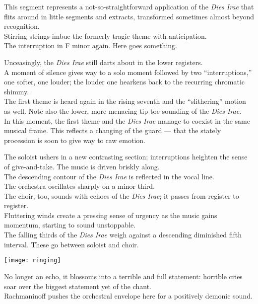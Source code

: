 \documentclass{beamer}
\begin{document}
\begin{frame} 
  This segment represents a not-so-straightforward application of the \textit{Dies Irae} that flits around in little segments and extracts, transformed sometimes almost beyond recognition. 
  \pause \\ 
  Stirring strings imbue the formerly tragic theme with anticipation. 
  \pause \\ 
  The interruption in F minor again. Here goes something. 
\end{frame}
  
\begin{frame} 
  Unceasingly, the \textit{Dies Irae} still darts about in the lower registers. 
  \pause \\ 
  A moment of silence gives way to a solo moment followed by two ``interruptions,'' one softer, one louder; the louder one hearkens back to the recurring chromatic shimmy. 
  \pause \\ 
  The first theme is heard again in the rising seventh and the ``slithering'' motion as well. Note also the lower, more menacing tip-toe sounding of the \textit{Dies Irae}. 
  \pause \\ 
  In this moment, the first theme and the \textit{Dies Irae} manage to coexist in the same musical frame. This reflects a changing of the guard --- that the stately procession is soon to give way to raw emotion. 
\end{frame} 

\begin{frame}
  The soloist ushers in a new contrasting section; interruptions heighten the sense of give-and-take. The music is driven briskly along. 
  \pause \\ 
  The descending contour of the \textit{Dies Irae} is reflected in the vocal line. 
  \pause \\
  The orchestra oscillates sharply on a minor third. 
  \pause \\ 
  The choir, too, sounds with echoes of the \textit{Dies Irae}; it passes from register to register. 
  \pause \\
  Fluttering winds create a pressing sense of urgency as the music gains momentum, starting to sound unstoppable. 
  \pause \\ 
  The falling thirds of the \textit{Dies Irae} weigh against a descending diminished fifth interval. These go between soloist and choir. 
\end{frame} 

\begin{frame}
  \begin{center} 
    \texttt{[image: ringing]} 
  \end{center} 
  No longer an echo, it blossoms into a terrible and full statement: horrible cries soar over the biggest statement yet of the chant. 
  \pause \\ 
  Rachmaninoff pushes the orchestral envelope here for a positively demonic sound. 
\end{frame} 
\end{document}
